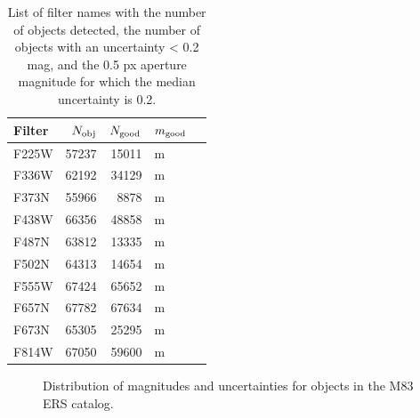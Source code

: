 \begin{table}
\centering
\caption{List of filter names with the number of objects detected, the number of objects with an uncertainty < 0.2 mag, and the 0.5 px aperture magnitude for which the median uncertainty is 0.2.}
\label{tab:cat_numbers}
\begin{tabular}{lrrlr}
\hline\hline
Filter & $N_{\rm obj}$ & $N_{\rm good}$ & $m_{\rm good}$ \\
\hline
F225W &  57237 & 15011 & m \\
F336W &  62192 & 34129 & m \\
F373N &  55966 & 8878 & m \\
F438W &  66356 & 48858 & m \\
F487N &  63812 & 13335 & m \\
F502N &  64313 & 14654 & m \\
F555W &  67424 & 65652 & m \\
F657N &  67782 & 67634 & m \\
F673N &  65305 & 25295 & m \\
F814W &  67050 & 59600 & m \\
\hline
\end{tabular}
\end{table}

\begin{figure}
\centering
{}
\hfill
{}
\caption{Distribution of magnitudes and uncertainties for objects in the \citet{chandar10} M83 ERS catalog.}
\label{fig:mag_unc}
\end{figure}

